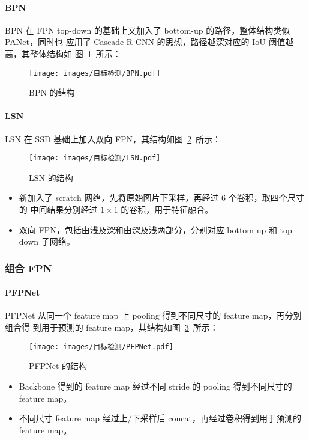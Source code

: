 \paragraph{BPN}
BPN 在 FPN top-down 的基础上又加入了 bottom-up 的路径，整体结构类似 PANet，同时也
应用了 Cascade R-CNN 的思想，路径越深对应的 IoU 阈值越高，其整体结构如
图~\ref{fig:BPN}~所示：

\begin{figure}[ht]
  \centering
  \texttt{[image: images/目标检测/BPN.pdf]}
  \caption{BPN 的结构}
  \label{fig:BPN}
\end{figure}

\paragraph{LSN}
LSN 在 SSD 基础上加入双向 FPN，其结构如图~\ref{fig:LSN}~所示：

\begin{figure}[ht]
  \centering
  \texttt{[image: images/目标检测/LSN.pdf]}
  \caption{LSN 的结构}
  \label{fig:LSN}
\end{figure}

\begin{itemize}
  \item 新加入了 scratch 网络，先将原始图片下采样，再经过 6 个卷积，取四个尺寸的
    中间结果分别经过 $1 \times 1$ 的卷积，用于特征融合。
  \item 双向 FPN，包括由浅及深和由深及浅两部分，分别对应 bottom-up 和 top-down
    子网络。
\end{itemize}

\subsubsection{组合 FPN}
\paragraph{PFPNet}
PFPNet 从同一个 feature map 上 pooling 得到不同尺寸的 feature map，再分别组合得
到用于预测的 feature map，其结构如图~\ref{fig:PFPNet}~所示：

\begin{figure}[ht]
  \centering
  \texttt{[image: images/目标检测/PFPNet.pdf]}
  \caption{PFPNet 的结构}
  \label{fig:PFPNet}
\end{figure}

\begin{itemize}
\item Backbone 得到的 feature map 经过不同 stride 的 pooling 得到不同尺寸的
  feature map。 
\item 不同尺寸 feature map 经过上/下采样后 concat，再经过卷积得到用于预测的
  feature map。
\end{itemize}

